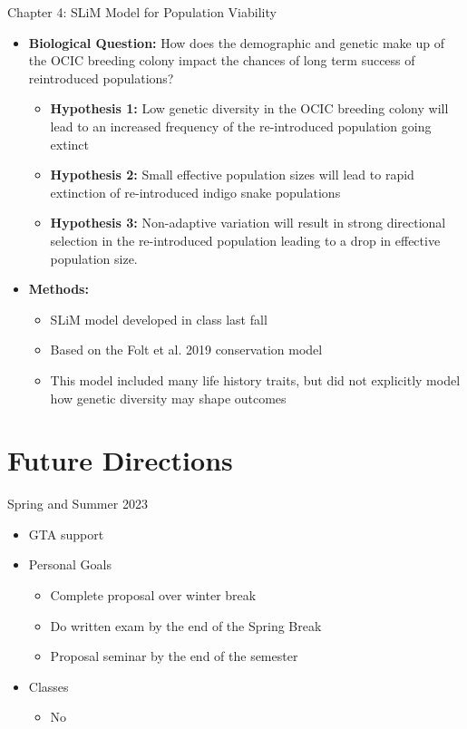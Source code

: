 \documentclass[10pt,aspectratio=169]{beamer}
\begin{document}
\begin{frame}{Chapter 4: SLiM Model for Population Viability}
\begin{itemize}
  \item \textbf{Biological Question:} How does the demographic and genetic make up of the OCIC breeding colony impact the chances of long term success of reintroduced populations?
  \begin{itemize}
    
    \item \textbf{Hypothesis 1:} Low genetic diversity in the OCIC breeding colony will lead to an increased frequency of the re-introduced population going extinct
    \item \textbf{Hypothesis 2:} Small effective population sizes will lead to rapid extinction of re-introduced indigo snake populations
    \item \textbf{Hypothesis 3:} Non-adaptive variation will result in strong directional selection in the re-introduced population leading to a drop in effective population size.
  \end{itemize}
  \item \textbf{Methods:}
    \begin{itemize}
      \item SLiM model developed in class last fall
      \item Based on the Folt et al. 2019 conservation model
      \item This model included many life history traits, but did not explicitly model how genetic diversity may shape outcomes
    \end{itemize}
  \end{itemize}
\end{frame}

\section[Year Goals]{Future Directions}

\begin{frame}{Spring and Summer 2023}
  \begin{itemize}
    \item GTA support
    \item Personal Goals
    \begin{itemize}
      \item Complete proposal over winter break
      \item Do written exam by the end of the Spring Break
      \item Proposal seminar by the end of the semester
    \end{itemize}
    \item Classes
    \begin{itemize}
      \item No
    \end{itemize}
  \end{itemize}

\end{frame}
\end{document}

